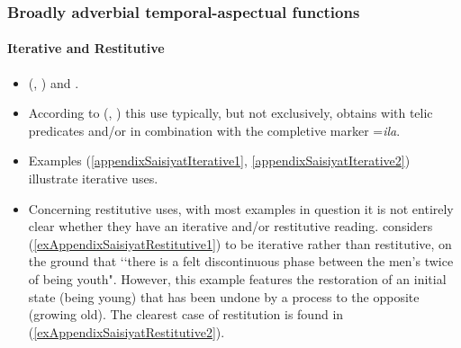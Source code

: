 \subsubsection{Broadly adverbial temporal-aspectual functions}
\paragraph{Iterative and Restitutive}
\label{appendixSaisiyatIterative}
\begin{itemize}
	\item \citeauthor{Huang2007} (\citeyear{Huang2007}, \citeyear[106–107, 101–110]{Huang2008}) and \textcite[155]{ZeitounEtal2015}. 
	\item According to \citeauthor{Huang2007} (\citeyear{Huang2007}, \citeyear{Huang2008}) this use typically, but not exclusively, obtains with telic predicates and/or in combination with the completive marker =\textit{ila}.
	\item Examples (\ref{appendixSaisiyatIterative1}, \ref{appendixSaisiyatIterative2}) illustrate iterative uses.
	\item Concerning restitutive uses, with most examples in question it is not entirely clear whether they have an iterative and/or restitutive reading.  \textcite[586]{Huang2007} considers (\ref{exAppendixSaisiyatRestitutive1}) to be iterative rather than restitutive, on the ground that \lq\lq there is a felt discontinuous phase between the men's twice of being youth". However, this example features the restoration of an initial state (being young) that has been undone by a process to the opposite (growing old). The clearest case of restitution is found in  (\ref{exAppendixSaisiyatRestitutive2}).
\end{itemize}

